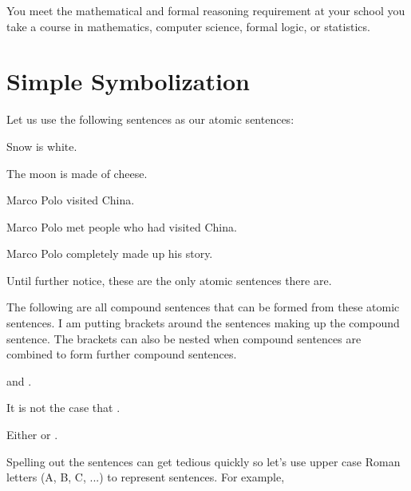 \begin{center}
 You meet the mathematical and formal reasoning requirement at your school 
 you take a course in mathematics, computer science, formal logic, 
or statistics.  \end{center}



\section{Simple Symbolization}\label{sec:SL-compound}

Let us use the following sentences as our atomic sentences:

\begin{slist}

\item Snow is white.

\item The moon is made of cheese.

\item Marco Polo visited China.

\item Marco Polo met people who had visited China.

\item Marco Polo completely made up his story.

\end{slist}

Until further notice, these are the only atomic sentences there are. 

The following are all compound sentences that can be formed from these atomic 
sentences.  I am putting brackets around the sentences making up the compound 
sentence. The brackets can also be nested when compound sentences are combined 
to form further compound sentences.

\begin{slist}
 
\item {} and .

 \item It is not the case that .

 \item Either  or .

\end{slist}


Spelling out the sentences can get tedious quickly so let's use upper case Roman 
letters (A, B, C, ...) to represent sentences. For example,

